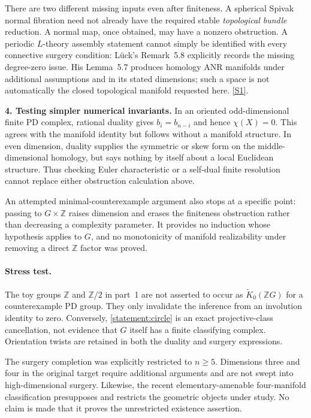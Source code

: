 \documentclass[11pt,a4paper]{article}
\newcommand{\Z}{\mathbb{Z}}
\newcommand{\sref}[2]{\hyperlink{source:#1:#2}{[S#2]}}
\numberwithin{equation}{section}
\begin{document}
There are two different missing inputs even after finiteness. A spherical
Spivak normal fibration need not already have the required stable
\emph{topological bundle} reduction. A normal map, once obtained, may
have a nonzero obstruction. A periodic $L$-theory assembly statement
cannot simply be identified with every connective surgery condition:
L\"uck's Remark~5.8 explicitly records the missing degree-zero issue.
His Lemma~5.7 produces homology ANR manifolds under additional assumptions
and in its stated dimensions; such a space is not automatically the
closed topological manifold requested here. \sref{statement}{1}.

\textbf{4. Testing simpler numerical invariants.}
In an oriented odd-dimensional finite PD complex, rational duality gives
$b_i=b_{n-i}$ and hence $\chi(X)=0$. This agrees with the manifold
identity but follows without a manifold structure. In even dimension,
duality supplies the symmetric or skew form on the middle-dimensional
homology, but says nothing by itself about a local Euclidean structure.
Thus checking Euler characteristic or a self-dual finite resolution
cannot replace either obstruction calculation above.

An attempted minimal-counterexample argument also stops at a specific
point: passing to $G\times\Z$ raises dimension and erases the finiteness
obstruction rather than decreasing a complexity parameter. It provides
no induction whose hypothesis applies to $G$, and no monotonicity of
manifold realizability under removing a direct $\Z$ factor was proved.

\paragraph{Stress test.}
The toy groups $\Z$ and $\Z/2$ in part~1 are not asserted to occur as
$\widetilde K_0(\Z G)$ for a counterexample PD group. They only invalidate
the inference from an involution identity to zero. Conversely,
\eqref{statement:circle} is an exact projective-class cancellation, not evidence
that $G$ itself has a finite classifying complex. Orientation twists are
retained in both the duality and surgery expressions.

The surgery completion was explicitly restricted to $n\ge5$.
Dimensions three and four in the original target require additional
arguments and are not swept into high-dimensional surgery. Likewise,
the recent elementary-amenable four-manifold classification presupposes
and restricts the geometric objects under study. No claim is made that
it proves the unrestricted existence assertion.
\end{document}
